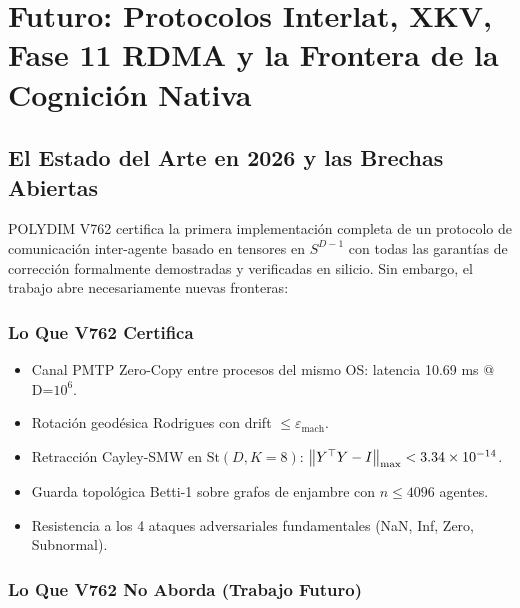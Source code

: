 \chapter{Futuro: Protocolos Interlat, XKV, Fase 11 RDMA y la Frontera de la Cognición Nativa}
\label{ch:futuro}

\section{El Estado del Arte en 2026 y las Brechas Abiertas}

POLYDIM V762 certifica la primera implementación completa de un protocolo de
comunicación inter-agente basado en tensores en $S^{D-1}$ con todas las
garantías de corrección formalmente demostradas y verificadas en silicio.
Sin embargo, el trabajo abre necesariamente nuevas fronteras:

\subsection{Lo Que V762 Certifica}

\begin{itemize}
\item Canal PMTP Zero-Copy entre procesos del mismo OS: latencia 10.69 ms @ D=$10^6$.
\item Rotación geodésica Rodrigues con drift $\le \varepsilon_{\text{mach}}$.
\item Retracción Cayley-SMW en $\text{St}(D,K=8)$: $\norm{Y^\top Y - I}_{\max} < 3.34\times10^{-14}$.
\item Guarda topológica Betti-1 sobre grafos de enjambre con $n \le 4096$ agentes.
\item Resistencia a los 4 ataques adversariales fundamentales (NaN, Inf, Zero, Subnormal).
\end{itemize}

\subsection{Lo Que V762 No Aborda (Trabajo Futuro)}

